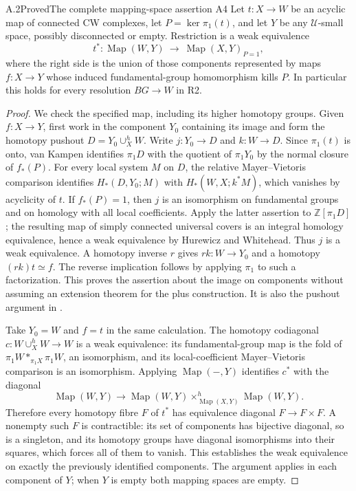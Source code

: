 \begin{claim}{A.2}{Proved}{The complete mapping-space assertion A4}
Let $t:X\to W$ be an acyclic map of connected CW complexes, let
$P=\ker\pi_1(t)$, and let $Y$ be any $\mathcal U$-small space, possibly
disconnected or empty. Restriction is a weak equivalence
\[
 t^*:\operatorname{Map}(W,Y)\ \longrightarrow\
 \operatorname{Map}(X,Y)_{P=1},
\]
where the right side is the union of those components represented by maps
$f:X\to Y$ whose induced fundamental-group homomorphism kills $P$.
In particular this holds for every resolution $BG\to W$ in R2.
\end{claim}
\begin{proof}
We check the specified map, including its higher homotopy groups. Given
$f:X\to Y$, first work in the component $Y_0$ containing its image and
form the homotopy pushout $D=Y_0\cup_X^h W$. Write
$j:Y_0\to D$ and $k:W\to D$. Since $\pi_1(t)$ is onto,
van Kampen identifies $\pi_1D$ with the quotient of $\pi_1Y_0$ by the
normal closure of $f_*(P)$. For every local system $M$ on $D$, the
relative Mayer--Vietoris comparison identifies
$H_*(D,Y_0;M)$ with $H_*(W,X;k^*M)$, which vanishes by acyclicity of
$t$. If $f_*(P)=1$, then $j$ is an isomorphism on fundamental groups
and on homology with all local coefficients. Apply the latter assertion
to $\mathbb Z[\pi_1D]$; the resulting map of simply connected universal
covers is an integral homology equivalence, hence a weak equivalence by
Hurewicz and Whitehead. Thus $j$ is a weak equivalence. A homotopy inverse
$r$ gives $rk:W\to Y_0$ and a homotopy $(rk)t\simeq f$.
The reverse implication follows by applying $\pi_1$ to such a factorization.
This proves the assertion about the image on components without assuming
an extension theorem for the plus construction. It is also the pushout
argument in \cite[Proposition 3.1]{A_HH1979}.

Take $Y_0=W$ and $f=t$ in the same calculation. The homotopy codiagonal
$c:W\cup_X^h W\to W$ is a weak equivalence: its fundamental-group map
is the fold of $\pi_1W*_{\pi_1X}\pi_1W$, an isomorphism, and its
local-coefficient Mayer--Vietoris comparison is an isomorphism. Applying
$\operatorname{Map}(-,Y)$ identifies $c^*$ with the diagonal
\[
 \operatorname{Map}(W,Y)\longrightarrow
 \operatorname{Map}(W,Y)
 \mathop{\times}^{h}_{\operatorname{Map}(X,Y)}
 \operatorname{Map}(W,Y).
\]
Therefore every homotopy fibre $F$ of $t^*$ has equivalence diagonal
$F\to F\times F$. A nonempty such $F$ is contractible: its set of
components has bijective diagonal, so is a singleton, and its homotopy
groups have diagonal isomorphisms into their squares, which forces
all of them to vanish. This establishes the weak equivalence on exactly
the previously identified components. The argument applies in each
component of $Y$; when $Y$ is empty both mapping spaces are empty.
\end{proof}

